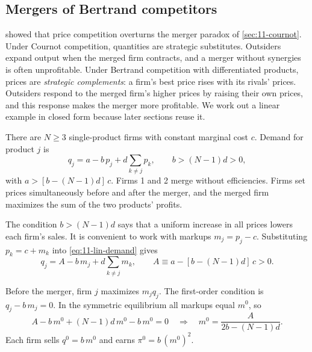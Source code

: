 \subsection{Mergers of Bertrand competitors}\label{sec:11-dd}

\citet{DeneckereDavidson1985} showed that price competition overturns the merger paradox of
\cref{sec:11-cournot}. Under Cournot competition, quantities are strategic substitutes. Outsiders expand output when
the merged firm contracts, and a merger without synergies is often unprofitable. Under Bertrand competition with
differentiated products, prices are \emph{strategic complements}: a firm's best price rises with its rivals'
prices. Outsiders respond to the merged firm's higher prices by raising their own prices, and this response makes
the merger more profitable. We work out a linear example in closed form because later sections reuse it.

\begin{assumption}\label{ass:11-linear}
There are $N \ge 3$ single-product firms with constant marginal cost $c$. Demand for product $j$ is
\begin{equation}\label{eq:11-lin-demand}
  q_j = a - b\,p_j + d \sum_{k \ne j} p_k , \qquad b > (N-1)d > 0 ,
\end{equation}
with $a > [b - (N-1)d]\,c$. Firms 1 and 2 merge without efficiencies. Firms set prices simultaneously before and
after the merger, and the merged firm maximizes the sum of the two products' profits.
\end{assumption}

The condition $b > (N-1)d$ says that a uniform increase in all prices lowers each firm's sales. It is convenient to
work with markups $m_j = p_j - c$. Substituting $p_k = c + m_k$ into \eqref{eq:11-lin-demand} gives
\begin{equation*}
  q_j = A - b\,m_j + d \sum_{k \ne j} m_k , \qquad A \equiv a - [b - (N-1)d]\,c > 0 .
\end{equation*}

Before the merger, firm $j$ maximizes $m_j q_j$. The first-order condition is $q_j - b\,m_j = 0$. In the symmetric
equilibrium all markups equal $m^0$, so
\begin{equation*}
  A - b\,m^0 + (N-1)d\,m^0 - b\,m^0 = 0
  \quad\Longrightarrow\quad
  m^0 = \frac{A}{2b - (N-1)d} .
\end{equation*}
Each firm sells $q^0 = b\,m^0$ and earns $\pi^0 = b\,(m^0)^2$.

